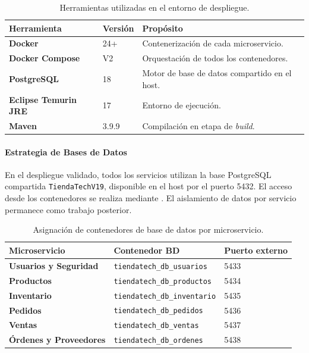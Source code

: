 \documentclass[12pt]{article}
\begin{document}
    \begin{table}[htbp]
        \centering
        \caption{Herramientas utilizadas en el entorno de despliegue.}
        \label{tab:herramientas-despliegue}
        \small
        \begin{tabularx}{\textwidth}{>{\bfseries}l l X}
\toprule
Herramienta & Versión & Propósito \\
\midrule
Docker & 24+ & Contenerización de cada microservicio. \\
Docker Compose & V2 & Orquestación de todos los contenedores. \\
PostgreSQL & 18 & Motor de base de datos compartido en el host. \\
Eclipse Temurin JRE & 17 & Entorno de ejecución. \\
Maven & 3.9.9 & Compilación en etapa de \textit{build}. \\
\bottomrule
        \end{tabularx}
    \end{table}

    \paragraph{Estrategia de Bases de Datos}

    En el despliegue validado, todos los servicios utilizan la base PostgreSQL compartida
    \texttt{TiendaTechV19}, disponible en el host por el puerto 5432. El acceso desde los
    contenedores se realiza mediante . El aislamiento de datos
    por servicio permanece como trabajo posterior.

    \begin{table}[htbp]
        \centering
        \caption{Asignación de contenedores de base de datos por microservicio.}
        \label{tab:contenedores-bd}
        \small
        \begin{tabularx}{\textwidth}{>{\bfseries}l X l}
\toprule
Microservicio & Contenedor BD & Puerto externo \\
\midrule
Usuarios y Seguridad & \texttt{tiendatech\_db\_usuarios} & 5433 \\
Productos & \texttt{tiendatech\_db\_productos} & 5434 \\
Inventario & \texttt{tiendatech\_db\_inventario} & 5435 \\
Pedidos & \texttt{tiendatech\_db\_pedidos} & 5436 \\
Ventas & \texttt{tiendatech\_db\_ventas} & 5437 \\
Órdenes y Proveedores & \texttt{tiendatech\_db\_ordenes} & 5438 \\
\bottomrule
        \end{tabularx}
    \end{table}
\end{document}
